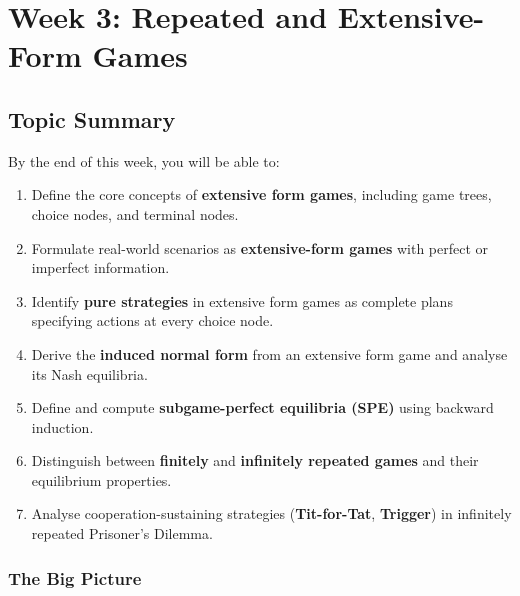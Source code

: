 \section{Week 3: Repeated and Extensive-Form Games}

\subsection{Topic Summary}

\begin{keybox}
By the end of this week, you will be able to:
\begin{enumerate}
  \item Define the core concepts of \textbf{extensive form games}, including game trees, choice nodes, and terminal nodes.
  \item Formulate real-world scenarios as \textbf{extensive-form games} with perfect or imperfect information.
  \item Identify \textbf{pure strategies} in extensive form games as complete plans specifying actions at every choice node.
  \item Derive the \textbf{induced normal form} from an extensive form game and analyse its Nash equilibria.
  \item Define and compute \textbf{subgame-perfect equilibria (SPE)} using backward induction.
  \item Distinguish between \textbf{finitely} and \textbf{infinitely repeated games} and their equilibrium properties.
  \item Analyse cooperation-sustaining strategies (\textbf{Tit-for-Tat}, \textbf{Trigger}) in infinitely repeated Prisoner's Dilemma.
\end{enumerate}
\end{keybox}

\separator

\subsubsection*{The Big Picture}

